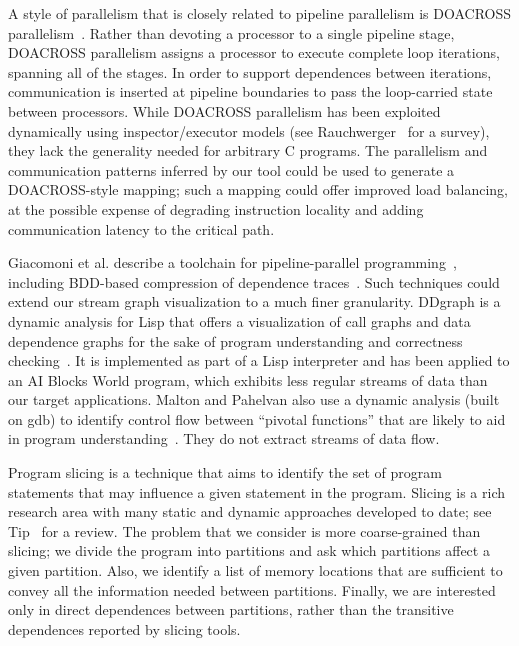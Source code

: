 A style of parallelism that is closely related to pipeline parallelism
is DOACROSS parallelism~\cite{cytron86doacross,padua80highspeed}.
Rather than devoting a processor to a single pipeline stage, DOACROSS
parallelism assigns a processor to execute complete loop iterations,
spanning all of the stages.  In order to support dependences between
iterations, communication is inserted at pipeline boundaries to pass
the loop-carried state between processors.  While DOACROSS parallelism
has been exploited dynamically using inspector/executor models (see
Rauchwerger~\cite{rauchwerger98runtime} for a survey), they lack the
generality needed for arbitrary C programs.  The parallelism and
communication patterns inferred by our tool could be used to generate
a DOACROSS-style mapping; such a mapping could offer improved load
balancing, at the possible expense of degrading instruction locality
and adding communication latency to the critical path.

Giacomoni et al. describe a toolchain for pipeline-parallel
programming~\cite{giacomoni07toolchain}, including BDD-based
compression of dependence traces~\cite{price06bdds}.  Such techniques
could extend our stream graph visualization to a much finer
granularity. 
DDgraph is a dynamic analysis for Lisp that offers a visualization of
call graphs and data dependence graphs for the sake of program
understanding and correctness checking~\cite{balmas05ddgraph}.  It is
implemented as part of a Lisp interpreter and has been applied to an
AI Blocks World program, which exhibits less regular streams of data
than our target applications.  Malton and Pahelvan also use a dynamic
analysis (built on gdb) to identify control flow between ``pivotal
functions'' that are likely to aid in program
understanding~\cite{malton05recovery}.  They do not extract streams of
data flow.

Program slicing is a technique that aims to identify the set of
program statements that may influence a given statement in the
program.  Slicing is a rich research area with many static and dynamic
approaches developed to date; see Tip~\cite{tip95slice} for a review.
The problem that we consider is more coarse-grained than slicing; we
divide the program into partitions and ask which partitions affect a
given partition.  Also, we identify a list of memory locations that
are sufficient to convey all the information needed between
partitions.  Finally, we are interested only in direct dependences
between partitions, rather than the transitive dependences reported by
slicing tools.

